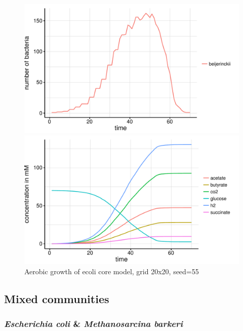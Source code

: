 \begin{figure}[h]
  \centering
  \begin{minipage}[t]{0.45\textwidth}
    \includegraphics[width=\textwidth]{../results/beijerinckii_20x20_seed943_growth.pdf}
  \end{minipage}
  \begin{minipage}[t]{0.45\textwidth}
    \includegraphics[width=\textwidth]{../results/beijerinckii_20x20_seed943_subs.pdf}
  \end{minipage}
  \caption{Aerobic growth of ecoli core model, grid 20x20, seed=55}
\end{figure}

\subsection{Mixed communities}
\subsubsection{\textit{Escherichia coli} \& \textit{Methanosarcina barkeri}}

